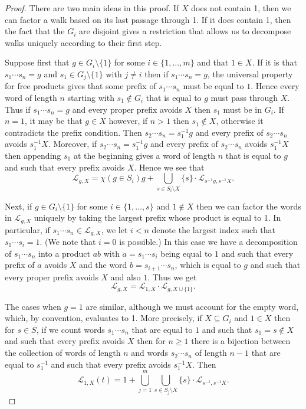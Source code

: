 \documentclass[11pt]{amsart}
\theoremstyle{definition}
\begin{document}
\begin{proof}
There are two main ideas in this proof. If $X$ does not contain 1,
then we can factor a walk based on its last passage through 1. If it
does contain 1, then the fact that the $G_i$ are disjoint gives a
restriction that allows us to decompose walks uniquely according to
their first step.  

Suppose first that $g\in G_i\setminus \{1\}$ for some
$i\in \{1,\ldots ,m\}$ and that $1\in X$. If it is that $s_1\cdots s_n=g$
and $s_1\in G_j\setminus \{1\}$ with $j\neq i$ then if
$s_1\cdots s_n=g$, the universal property for free
products gives that some prefix of $s_1\cdots s_n$
must be equal to $1$.
Hence every word of length $n$ starting with
$s_1\not\in G_i$ that is equal to $g$ must pass through $X$.  Thus if
$s_1\cdots s_n=g$ and every proper prefix avoids $X$ then $s_1$ must be in
$G_i$. If $n=1$, it may be
that $g\in X$ however,  if $n>1$ then $s_1\not\in X$, otherwise it
contradicts the prefix condition.   Then
$s_2\cdots s_n= s_1^{-1}g$ and every prefix of $s_2\cdots s_n$ avoids
$s_1^{-1}X$.  Moreover, if $s_2\cdots s_n= s_1^{-1}g$ and every prefix
of $s_2\cdots s_n$ avoids $s_1^{-1}X$ then appending $s_1$ at the
beginning gives a word of length $n$ that is equal to $g$ and such
that every prefix avoids $X$.  Hence we see that
\[\mathcal{L}_{g,X}= \chi(g\in S_i){g} + \bigcup_{s\in S_i\setminus X} \{s\}\cdot
\mathcal{L}_{s^{-1}g,s^{-1}X}.\]

Next, if $g\in G_i\setminus \{1\}$ for some $i\in \{1,\ldots ,s\}$ and $1\not\in X$
then we can factor the words in $\mathcal{L}_{g,X}$ uniquely by taking the largest prefix whose
product is equal to 1. In particular, if 
$s_1\cdots s_n\in \mathcal{L}_{g,X}$, we let $i<n$ denote the largest index such that $s_1\cdots s_i=1$.  (We note that $i=0$ is possible.) In this case we have a decomposition of $s_1\cdots s_n$ into a product $ab$ with $a=s_1\cdots s_i$ being equal to $1$ and such that every prefix of $a$ avoids $X$ and the word $b=s_{i+1}\cdots s_n$, which is equal to $g$ and such that every proper prefix avoids $X$ and also $1$.
Thus we get 
\[\mathcal{L}_{g,X} =  \mathcal{L}_{1,X}\cdot \mathcal{L}_{g,X\cup \{1\}}.\]

The cases when $g=1$ are similar, although we must 
account for the empty word, which, by convention, evaluates to 1. More precisely, if
$X\subseteq G_i$ and $1\in X$ then for $s\in S$, if we count words
$s_1\cdots s_n$ that are equal to $1$ and such that $s_1=s\not\in X$
and such that every prefix avoids $X$ then for $n\ge 1$ there is a
bijection between the collection of words of length $n$ and words
$s_2\cdots s_n$ of length $n-1$ that are equal to $s_1^{-1}$ and such
that every prefix avoids $s_1^{-1}X$.  Then
\[\mathcal{L}_{1,X}(t) = 1+\bigcup_{j=1}^m \bigcup_{s\in S_j\setminus
    X} \{s\} \cdot \mathcal{L}_{s^{-1}, s^{-1}X}.\]
\end{proof}
\end{document}
